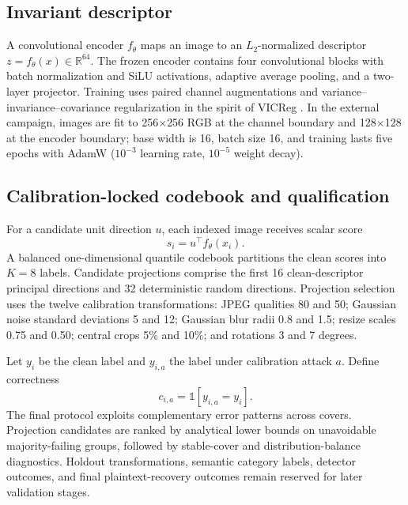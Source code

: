 \subsection{Invariant descriptor}

A convolutional encoder $f_\theta$ maps an image to an $L_2$-normalized descriptor $z=f_\theta(x)\in\mathbb{R}^{64}$. The frozen encoder contains four convolutional blocks with batch normalization and SiLU activations, adaptive average pooling, and a two-layer projector. Training uses paired channel augmentations and variance--invariance--covariance regularization in the spirit of VICReg \cite{bardes2022vicreg}. In the external campaign, images are fit to 256$\times$256 RGB at the channel boundary and 128$\times$128 at the encoder boundary; base width is 16, batch size 16, and training lasts five epochs with AdamW ($10^{-3}$ learning rate, $10^{-5}$ weight decay).

\subsection{Calibration-locked codebook and qualification}

For a candidate unit direction $u$, each indexed image receives scalar score
\begin{equation}
  s_i = u^\top f_\theta(x_i).
\end{equation}
A balanced one-dimensional quantile codebook partitions the clean scores into $K=8$ labels. Candidate projections comprise the first 16 clean-descriptor principal directions and 32 deterministic random directions. Projection selection uses the twelve calibration transformations: JPEG qualities 80 and 50; Gaussian noise standard deviations 5 and 12; Gaussian blur radii 0.8 and 1.5; resize scales 0.75 and 0.50; central crops 5\% and 10\%; and rotations 3 and 7 degrees.

Let $y_i$ be the clean label and $y_{i,a}$ the label under calibration attack $a$. Define correctness
\begin{equation}
 c_{i,a}=\mathbb{1}[y_{i,a}=y_i].
\end{equation}
The final protocol exploits complementary error patterns across covers. Projection candidates are ranked by analytical lower bounds on unavoidable majority-failing groups, followed by stable-cover and distribution-balance diagnostics. Holdout transformations, semantic category labels, detector outcomes, and final plaintext-recovery outcomes remain reserved for later validation stages.

